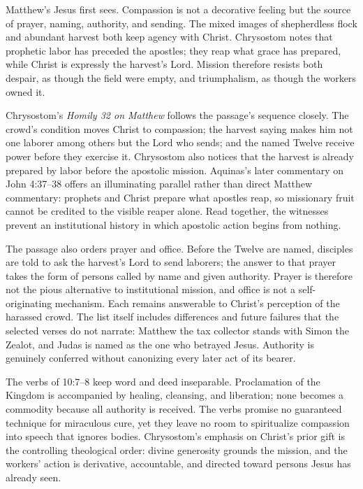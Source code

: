 Matthew's Jesus first sees. Compassion is not a decorative feeling but the source of prayer, naming, authority, and sending. The mixed images of shepherdless flock and abundant harvest both keep agency with Christ. Chrysostom notes that prophetic labor has preceded the apostles; they reap what grace has prepared, while Christ is expressly the harvest's Lord. Mission therefore resists both despair, as though the field were empty, and triumphalism, as though the workers owned it.

Chrysostom's \emph{Homily 32 on Matthew} follows the passage's sequence closely. The crowd's condition moves Christ to compassion; the harvest saying makes him not one laborer among others but the Lord who sends; and the named Twelve receive power before they exercise it. Chrysostom also notices that the harvest is already prepared by labor before the apostolic mission. Aquinas's later commentary on John 4:37--38 offers an illuminating parallel rather than direct Matthew commentary: prophets and Christ prepare what apostles reap, so missionary fruit cannot be credited to the visible reaper alone. Read together, the witnesses prevent an institutional history in which apostolic action begins from nothing.

The passage also orders prayer and office. Before the Twelve are named, disciples are told to ask the harvest's Lord to send laborers; the answer to that prayer takes the form of persons called by name and given authority. Prayer is therefore not the pious alternative to institutional mission, and office is not a self-originating mechanism. Each remains answerable to Christ's perception of the harassed crowd. The list itself includes differences and future failures that the selected verses do not narrate: Matthew the tax collector stands with Simon the Zealot, and Judas is named as the one who betrayed Jesus. Authority is genuinely conferred without canonizing every later act of its bearer.

The verbs of 10:7--8 keep word and deed inseparable. Proclamation of the Kingdom is accompanied by healing, cleansing, and liberation; none becomes a commodity because all authority is received. The verbs promise no guaranteed technique for miraculous cure, yet they leave no room to spiritualize compassion into speech that ignores bodies. Chrysostom's emphasis on Christ's prior gift is the controlling theological order: divine generosity grounds the mission, and the workers' action is derivative, accountable, and directed toward persons Jesus has already seen.

